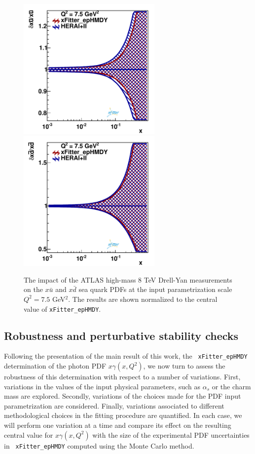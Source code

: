 \begin{figure}[t]
\centering
\includegraphics[width=7cm]{figs/q2_7_5_pdf_ubar_ratio.pdf}
\includegraphics[width=7cm]{figs/q2_7_5_pdf_dbar_ratio.pdf} 
\caption{The impact of the ATLAS high-mass 8 TeV Drell-Yan measurements
  on the $x\bar{u}$ and $x\bar{d}$ sea quark PDFs at the input
  parametrization scale $Q^2=7.5$ GeV$^2$.
  The results are shown normalized to the central value of {\tt xFitter\_epHMDY}. 
  }
\label{fig:QCDfit}
\end{figure}

\subsection{Robustness and perturbative stability checks}
\label{sec:crosschecks}

Following the presentation of the main result of this work, the {\tt
  xFitter\_epHMDY} determination of the
photon PDF $x\gamma(x,Q^2)$, we now turn to assess the robustness of this determination
with respect to a number of variations.
%
First, variations in the values of the input
physical parameters, such as $\alpha_s$ or the charm mass are explored.
%
Secondly, variations of the choices made for the PDF input parametrization
are considered.
%
Finally,
variations associated to different methodological choices in
the fitting procedure are quantified.
%
In each case, we will perform one variation at a time
and compare its effect on the resulting central value
for $x\gamma(x,Q^2)$ with the size of the experimental PDF
uncertainties in {\tt
  xFitter\_epHMDY} computed using the Monte Carlo method.

